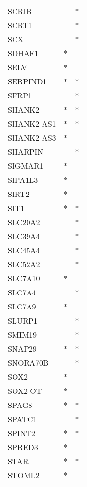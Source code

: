 \begin{longtable}{lcc}
SCRIB        &           &       * \\
SCRT1        &           &       * \\
SCX          &           &       * \\
SDHAF1       &         * &         \\
SELV         &         * &         \\
SERPIND1     &         * &       * \\
SFRP1        &           &       * \\
SHANK2       &         * &       * \\
SHANK2-AS1   &         * &       * \\
SHANK2-AS3   &         * &         \\
SHARPIN      &           &       * \\
SIGMAR1      &         * &         \\
SIPA1L3      &         * &         \\
SIRT2        &         * &         \\
SIT1         &         * &       * \\
SLC20A2      &           &       * \\
SLC39A4      &           &       * \\
SLC45A4      &           &       * \\
SLC52A2      &           &       * \\
SLC7A10      &         * &         \\
SLC7A4       &           &       * \\
SLC7A9       &         * &         \\
SLURP1       &           &       * \\
SMIM19       &           &       * \\
SNAP29       &         * &       * \\
SNORA70B     &           &       * \\
SOX2         &         * &         \\
SOX2-OT      &         * &         \\
SPAG8        &         * &       * \\
SPATC1       &           &       * \\
SPINT2       &         * &       * \\
SPRED3       &         * &         \\
STAR         &         * &       * \\
STOML2       &         * &         \\

\end{longtable}
